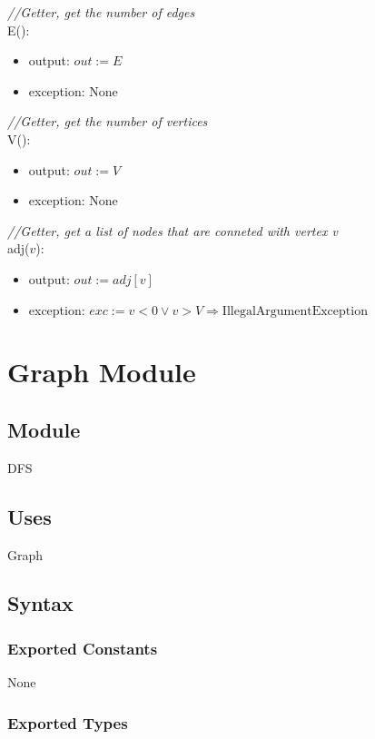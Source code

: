 \documentclass[12pt]{article}
\begin{document}
\noindent \textit{//Getter, get the number of edges}\\
\noindent E():
\begin{itemize}
\item output: $out := E$
\item exception: None
\end{itemize}

\noindent \textit{//Getter, get the number of vertices}\\
\noindent V():
\begin{itemize}
\item output: $out := V$
\item exception: None
\end{itemize}

\noindent \textit{//Getter, get a list of nodes that are conneted with vertex v}\\
\noindent adj($v$):
\begin{itemize}
\item output: $out := adj[v]$
\item exception: $exc := v < 0 \lor v > V \Rightarrow \mbox{IllegalArgumentException}$
\end{itemize}
\newpage

\section* {Graph Module}

\subsection*{Module}

DFS

\subsection* {Uses}

Graph

\subsection* {Syntax}

\subsubsection* {Exported Constants}

None

\subsubsection* {Exported Types}
\end{document}
